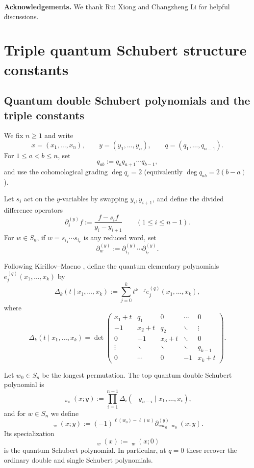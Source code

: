 \documentclass{amsart}
\theoremstyle{definition}
\theoremstyle{remark}
\numberwithin{equation}{section}
\DeclareMathOperator{\qsch}{\widetilde{\mathfrak{S}}}
\begin{document}
\textbf{Acknowledgements.} We thank Rui Xiong and Changzheng Li for helpful discussions.

\section{Triple quantum Schubert structure constants} \label{section:definitions}

\subsection{Quantum double Schubert polynomials and the triple constants}
We fix $n\geq 1$ and write
$$x=(x_1,\ldots,x_n),\qquad y=(y_1,\ldots,y_n),\qquad q=(q_1,\ldots,q_{n-1}).$$
For $1\leq a<b\leq n$, set
$$q_{ab}:=q_aq_{a+1}\cdots q_{b-1},$$
and use the cohomological grading $\deg q_i=2$ (equivalently $\deg q_{ab}=2(b-a)$).

Let $s_i$ act on the $y$-variables by swapping $y_i,y_{i+1}$, and define the divided difference operators
$$\partial_i^{(y)}f:=\frac{f-s_i f}{y_i-y_{i+1}}\qquad(1\leq i\leq n-1).$$
For $w\in S_n$, if $w=s_{i_1}\cdots s_{i_r}$ is any reduced word, set
$$\partial_w^{(y)}:=\partial_{i_1}^{(y)}\cdots \partial_{i_r}^{(y)}.$$

Following Kirillov--Maeno \cite{kirillov2000quantum}, define the quantum elementary polynomials $e_j^{(q)}(x_1,\ldots,x_k)$ by
$$\Delta_k(t\mid x_1,\ldots,x_k):=\sum_{j=0}^k t^{k-j}e_j^{(q)}(x_1,\ldots,x_k),$$
where
$$\Delta_k(t\mid x_1,\ldots,x_k)=\det\!\begin{pmatrix}
x_1+t & q_1 & 0 & \cdots & 0\\
-1 & x_2+t & q_2 & \ddots & \vdots\\
0 & -1 & x_3+t & \ddots & 0\\
\vdots & \ddots & \ddots & \ddots & q_{k-1}\\
0 & \cdots & 0 & -1 & x_k+t
\end{pmatrix}.
$$

Let $w_0\in S_n$ be the longest permutation. The top quantum double Schubert polynomial is
$$\qsch_{w_0}(x;y):=\prod_{i=1}^{n-1}\Delta_i(-y_{n-i}\mid x_1,\ldots,x_i),$$
and for $w\in S_n$ we define
$$\qsch_w(x;y):=(-1)^{\ell(w_0) - \ell(w)}\partial_{ww_0}^{(y)}\qsch_{w_0}(x;y).$$
Its specialization
$$\qsch_w(x):=\qsch_w(x;0)$$
is the quantum Schubert polynomial. In particular, at $q=0$ these recover the ordinary double and single Schubert polynomials.
\end{document}
